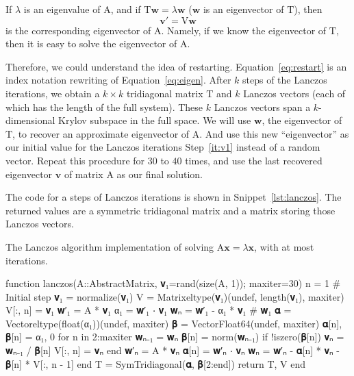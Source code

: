 If $\lambda$ is an eigenvalue of $\mathrm{A}$, and if $\mathrm{T}\bm{w} = \lambda \bm{w}$
($\bm{w}$ is an eigenvector of $\mathrm{T}$), then
%
\begin{equation}\label{eq:eigen}
    \bm{v}' = \mathrm{V} \bm{w}
\end{equation}
%
is the corresponding eigenvector of $\mathrm{A}$. Namely, if we know the eigenvector
of $\mathrm{T}$, then it is easy to solve the eigenvector of $\mathrm{A}$.

Therefore, we could understand the idea of restarting.
Equation~\eqref{eq:restart} is an index notation rewriting of Equation~\eqref{eq:eigen}.
After \(k\) steps of the Lanczos iterations, we obtain a $k \times k$ tridiagonal matrix
$\mathrm{T}$ and $k$ Lanczos vectors (each of which has the length
of the full system).
These $k$ Lanczos vectors span a $k$-dimensional Krylov subspace in the full space.
We will use $\bm{w}$, the eigenvector of $\mathrm{T}$, to recover an approximate
eigenvector of $\mathrm{A}$. And use this new ``eigenvector'' as our initial value
for the Lanczos iterations Step~\ref{it:v1} instead of a random vector.
Repeat this procedure for $30$ to $40$ times, and use the last recovered
eigenvector $\bm{v}$ of matrix $\mathrm{A}$ as our final solution.

The code for a  steps of Lanczos iterations is shown in
Snippet~\ref{lst:lanczos}. The returned values are a symmetric tridiagonal matrix
 and a matrix  storing those Lanczos vectors.

\begin{algorithm}[!hbt]
    \caption{The Lanczos algorithm implementation of solving
        \(\mathrm{ A }\bm{ x } = \lambda\bm{ x }\), with at most 
        iterations.}
    \label{lst:lanczos}
    \begin{juliacode}
function lanczos(A::AbstractMatrix, 𝐯₁=rand(size(A, 1)); maxiter=30)
    n = 1  # Initial step
    𝐯₁ = normalize(𝐯₁)
    V = Matrix{eltype(𝐯₁)}(undef, length(𝐯₁), maxiter)
    V[:, n] = 𝐯₁
    𝐰′₁ = A * 𝐯₁
    α₁ = 𝐰′₁ ⋅ 𝐯₁
    𝐰ₙ = 𝐰′₁ - α₁ * 𝐯₁  # 𝐰₁
    𝛂 = Vector{eltype(float(α₁))}(undef, maxiter)
    𝛃 = Vector{Float64}(undef, maxiter)
    𝛂[n], 𝛃[n] = α₁, 0
    for n in 2:maxiter
        𝐰ₙ₋₁ = 𝐰ₙ
        𝛃[n] = norm(𝐰ₙ₋₁)
        if !iszero(𝛃[n])
            𝐯ₙ = 𝐰ₙ₋₁ / 𝛃[n]
            V[:, n] = 𝐯ₙ
        end
        𝐰′ₙ = A * 𝐯ₙ
        𝛂[n] = 𝐰′ₙ ⋅ 𝐯ₙ
        𝐰ₙ = 𝐰′ₙ - 𝛂[n] * 𝐯ₙ - 𝛃[n] * V[:, n - 1]
    end
    T = SymTridiagonal(𝛂, 𝛃[2:end])
    return T, V
end
    \end{juliacode}
\end{algorithm}

